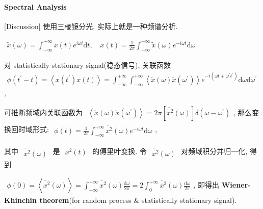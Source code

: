 \documentclass[../../main.tex]{subfiles}
\begin{document}
\paragraph{Spectral Analysis}

[Discussion] 使用三棱镜分光, 实际上就是一种频谱分析. 

$\begin{aligned}
    \widetilde{x}(\omega) = \int_{-\infty}^{+\infty}x(t)e^{i\omega t}\mathrm{d}t,\quad 
    x(t) = \frac{1}{2\pi}\int_{-\infty}^{+\infty}\widetilde{x}(\omega)e^{-i\omega t}\mathrm{d}\omega
\end{aligned}$

对 statistically stationary signal(稳态信号), 关联函数
$\begin{aligned}
    \phi\left(t^{\prime}-t\right) = \left\langle
        x\left(t^{\prime}\right)x(t)
    \right\rangle = \int_{-\infty}^{+\infty}\int_{-\infty}^{+\infty}\left\langle \widetilde{x}(\omega)\widetilde{x}\left(\omega^{\prime}\right)\right\rangle e^{-i\left(\omega t+\omega^{\prime}t^{\prime}\right)}\mathrm{d}\omega\mathrm{d}\omega^{\prime}
\end{aligned}$, 
    
可推断频域内关联函数为 $\begin{aligned}
    \left\langle \widetilde{x}(\omega)\widetilde{x}\left(\omega^{\prime}\right)\right\rangle 
    = 2\pi\left[\widetilde{x^{2}}(\omega)\right]\delta\left(\omega-\omega^{\prime}\right)
\end{aligned}$, 那么变换回时域形式: $\begin{aligned}
    \phi(t) = \frac{1}{2\pi}\int_{-\infty}^{+\infty}\widetilde{x^{2}}(\omega)e^{-i\omega t}\mathrm{d}\omega
\end{aligned}$, 

其中 $\begin{aligned}
    \widetilde{x^{2}}(\omega)
\end{aligned}$ 是 $\begin{aligned}
    x^{2}(t)
\end{aligned}$ 的傅里叶变换. 令 $\begin{aligned}
    \widetilde{x^{2}}(\omega)
\end{aligned}$ 对频域积分并归一化, 得到

$\begin{aligned}
    \phi(0) 
    = \left\langle \widetilde{x^{2}}(\omega)\right\rangle 
    = \int_{-\infty}^{+\infty}\widetilde{x^{2}}(\omega)\frac{\mathrm{d}\omega }{2\pi}
    = 2\int_{0}^{+\infty}\widetilde{x^{2}}(\omega)\frac{\mathrm{d}\omega}{2\pi}
\end{aligned}$, 即得出 \textbf{Wiener-Khinchin theorem}(for random process \& statistically stationary signal).
\end{document}
